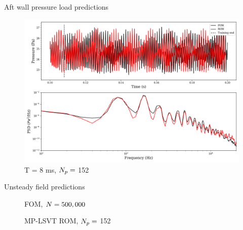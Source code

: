 \documentclass[]{beamer}
\begin{document}
\begin{frame}{Aft wall pressure load predictions}
	\centering
	\begin{figure}
		\includegraphics[width=0.85\linewidth]{experiments/2d_cavity/signalProc_point8_8ms_k152.png}
		\caption*{T = 8 ms, $N_p =$ 152}
	\end{figure}
\end{frame}

\begin{frame}{Unsteady field predictions}
	\begin{figure}
		\begin{minipage}{0.49\linewidth}
			\caption*{FOM, $N = 500,000$}
		\end{minipage}
		\begin{minipage}{0.49\linewidth}
				\caption*{MP-LSVT ROM, $N_p =$ 152}
		\end{minipage}
	\end{figure}
\end{frame}
\end{document}
